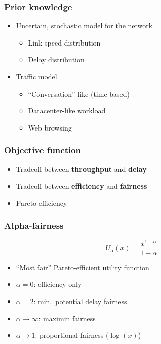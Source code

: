 \documentclass[svgnames]{beamer}
\begin{document}
\begin{frame}
\frametitle{Prior knowledge}

\begin{itemize}

\item Uncertain, stochastic model for the network

\begin{itemize}
\item Link speed distribution
\item Delay distribution

\end{itemize}

\item Traffic model

\begin{itemize}
\item ``Conversation''-like (time-based)
\item Datacenter-like workload
\item Web browsing
\end{itemize}

\end{itemize}

\end{frame}

\begin{frame}
\frametitle{Objective function}

\begin{itemize}

\item Tradeoff between \textbf{throughput} and \textbf{delay}

\item Tradeoff between \textbf{efficiency} and \textbf{fairness}

\item Pareto-efficiency

\end{itemize}

\end{frame}

\begin{frame}
\frametitle{Alpha-fairness}

$$U_{\alpha}(x) = \frac{x^{1-\alpha}}{1-\alpha}$$

\begin{itemize}

\item ``Most fair'' Pareto-efficient utility function

\item $\alpha = 0$: efficiency only

\item $\alpha = 2$: min.~potential delay fairness

\item $\alpha \rightarrow \infty$: maximin fairness

\item $\alpha \rightarrow 1$: proportional fairness ($\log(x)$)

\end{itemize}

\end{frame}
\end{document}
